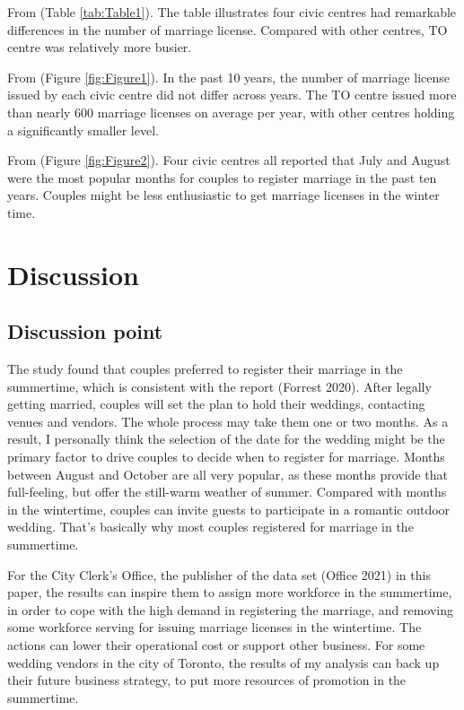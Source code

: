 \documentclass[
]{article}
\begin{document}
From (Table \ref{tab:Table1}). The table illustrates four civic centres had remarkable differences in the number of marriage license. Compared with other centres, TO centre was relatively more busier.

From (Figure \ref{fig:Figure1}). In the past 10 years, the number of marriage license issued by each civic centre did not differ across years. The TO centre issued more than nearly 600 marriage licenses on average per year, with other centres holding a significantly smaller level.

From (Figure \ref{fig:Figure2}). Four civic centres all reported that July and August were the most popular months for couples to register marriage in the past ten years. Couples might be less enthusiastic to get marriage licenses in the winter time.

\hypertarget{discussion}{%
\section{Discussion}\label{discussion}}

\hypertarget{discussion-point}{%
\subsection{Discussion point}\label{discussion-point}}

The study found that couples preferred to register their marriage in the summertime, which is consistent with the report (Forrest 2020). After legally getting married, couples will set the plan to hold their weddings, contacting venues and vendors. The whole process may take them one or two months. As a result, I personally think the selection of the date for the wedding might be the primary factor to drive couples to decide when to register for marriage. Months between August and October are all very popular, as these months provide that full-feeling, but offer the still-warm weather of summer. Compared with months in the wintertime, couples can invite guests to participate in a romantic outdoor wedding. That's basically why most couples registered for marriage in the summertime.

For the City Clerk's Office, the publisher of the data set (Office 2021) in this paper, the results can inspire them to assign more workforce in the summertime, in order to cope with the high demand in registering the marriage, and removing some workforce serving for issuing marriage licenses in the wintertime. The actions can lower their operational cost or support other business. For some wedding vendors in the city of Toronto, the results of my analysis can back up their future business strategy, to put more resources of promotion in the summertime.
\end{document}
